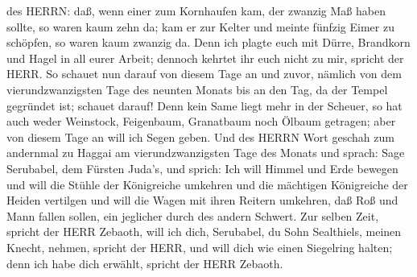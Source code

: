 des HERRN:  daß, wenn einer zum Kornhaufen kam, der zwanzig
Maß haben sollte, so waren kaum zehn da; kam er zur Kelter und meinte
fünfzig Eimer zu schöpfen, so waren kaum zwanzig da.  Denn
ich plagte euch mit Dürre, Brandkorn und Hagel in all eurer Arbeit;
dennoch kehrtet ihr euch nicht zu mir, spricht der HERR. 
So schauet nun darauf von diesem Tage an und zuvor, nämlich von dem
vierundzwanzigsten Tage des neunten Monats bis an den Tag, da der Tempel
gegründet ist; schauet darauf!  Denn kein Same liegt mehr
in der Scheuer, so hat auch weder Weinstock, Feigenbaum, Granatbaum noch
Ölbaum getragen; aber von diesem Tage an will ich Segen geben.
 Und des HERRN Wort geschah zum andernmal zu Haggai am
vierundzwanzigsten Tage des Monats und sprach:  Sage
Serubabel, dem Fürsten Juda's, und sprich: Ich will Himmel und Erde
bewegen  und will die Stühle der Königreiche umkehren und
die mächtigen Königreiche der Heiden vertilgen und will die Wagen mit
ihren Reitern umkehren, daß Roß und Mann fallen sollen, ein jeglicher
durch des andern Schwert.  Zur selben Zeit, spricht der
HERR Zebaoth, will ich dich, Serubabel, du Sohn Sealthiels, meinen
Knecht, nehmen, spricht der HERR, und will dich wie einen Siegelring
halten; denn ich habe dich erwählt, spricht der HERR Zebaoth.

